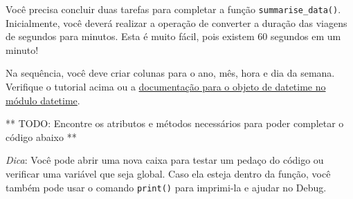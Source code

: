 \documentclass[11pt]{article}
\begin{document}
Você precisa concluir duas tarefas para completar a função
\texttt{summarise\_data()}. Inicialmente, você deverá realizar a
operação de converter a duração das viagens de segundos para minutos.
Esta é muito fácil, pois existem 60 segundos em um minuto!

Na sequência, você deve criar colunas para o ano, mês, hora e dia da
semana. Verifique o tutorial acima ou a
\href{https://docs.python.org/2/library/datetime.html\#datetime-objects}{documentação
para o objeto de datetime no módulo datetime}.

** TODO: Encontre os atributos e métodos necessários para poder
completar o código abaixo **

\emph{Dica}: Você pode abrir uma nova caixa para testar um pedaço do
código ou verificar uma variável que seja global. Caso ela esteja dentro
da função, você também pode usar o comando \texttt{print()} para
imprimi-la e ajudar no Debug.
\end{document}
